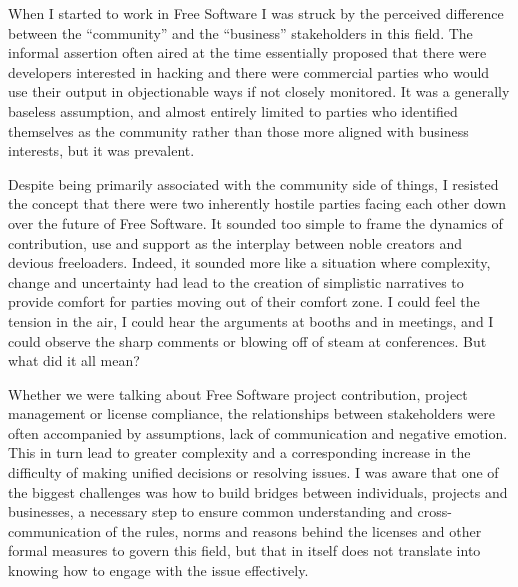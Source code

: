 

When I started to work in Free Software I was struck by the perceived difference
between the ``community'' and the ``business'' stakeholders in this field. The
informal assertion often aired at the time essentially proposed that there were
developers interested in hacking and there were commercial parties who would use
their output in objectionable ways if not closely monitored. It was a generally
baseless assumption, and almost entirely limited to parties who identified
themselves as the community rather than those more aligned with business
interests, but it was prevalent.

Despite being primarily associated with the community side of things, I resisted
the concept that there were two inherently hostile parties facing each other
down over the future of Free Software. It sounded too simple to frame the
dynamics of contribution, use and support as the interplay between noble
creators and devious freeloaders. Indeed, it sounded more like a situation where
complexity, change and uncertainty had lead to the creation of simplistic
narratives to provide comfort for parties moving out of their comfort zone. I
could feel the tension in the air, I could hear the arguments at booths and in
meetings, and I could observe the sharp comments or blowing off of steam at
conferences. But what did it all mean?

Whether we were talking about Free Software project contribution, project
management or license compliance, the relationships between stakeholders were
often accompanied by assumptions, lack of communication and negative emotion.
This in turn lead to greater complexity and a corresponding increase in the
difficulty of making unified decisions or resolving issues. I was aware that one
of the biggest challenges was how to build bridges between individuals, projects
and businesses, a necessary step to ensure common understanding and
cross-communication of the rules, norms and reasons behind the licenses and
other formal measures to govern this field, but that in itself does not
translate into knowing how to engage with the issue effectively.

